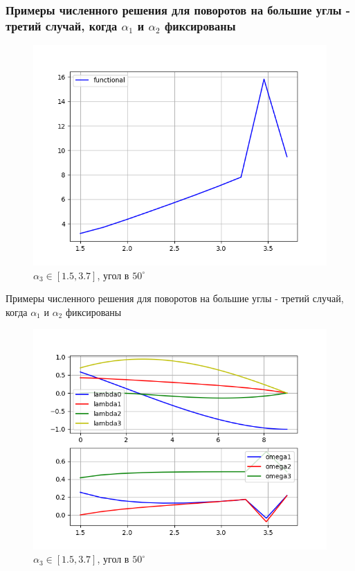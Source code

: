 \documentclass[10pt,utf8,presentation,notheorems,xcolor=dvipsnames,compress]{beamer}
\begin{document}
\begin{frame}
\frametitle{Примеры численного решения для поворотов на большие углы - третий случай, когда $\alpha_1$ и $\alpha_2$ фиксированы}
\begin{figure}[H]
\center\includegraphics[scale=0.5]{fig/functional_1_5-3_7_50.png}
\caption{$\alpha_3 \in [1.5, 3.7]$, угол в $50^{\circ}$}
\end{figure}
\end{frame}

\begin{frame}{Примеры численного решения для поворотов на большие углы - третий случай, когда $\alpha_1$ и $\alpha_2$ фиксированы}
\begin{figure}[H]
\center\includegraphics[scale=0.5]{fig/ivp_and_control_1_5-3_7_50.png}
\caption{$\alpha_3 \in [1.5, 3.7]$, угол в $50^{\circ}$}
\end{figure}
\end{frame}
\end{document}
